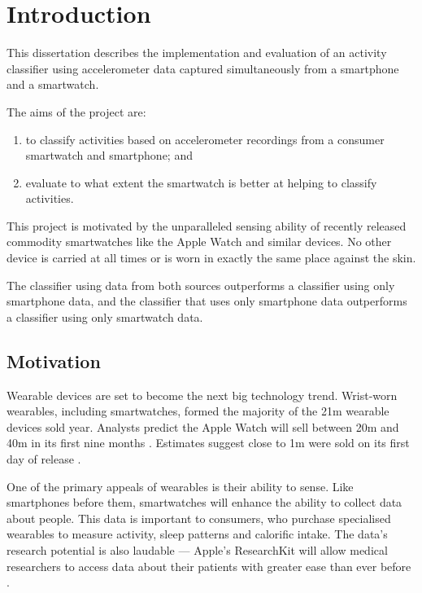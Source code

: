 \chapter{Introduction}
  This dissertation describes the implementation and evaluation of an activity classifier using 
  accelerometer data captured simultaneously from a smartphone and a smartwatch.  
  
  The aims of the project are:
  \begin{enumerate}
    \item to classify activities based on accelerometer recordings from a consumer smartwatch and smartphone; and
    \item evaluate to what extent the smartwatch is better at helping to classify activities.
  \end{enumerate}
  
  This project is motivated by the unparalleled sensing ability of recently released commodity 
  smartwatches like the Apple Watch and similar devices. No other device is carried at all times or is worn in exactly the same place against the skin.
  
  The classifier using data from both sources outperforms a classifier using only smartphone data,
  and the classifier that uses only smartphone data outperforms a classifier using only smartwatch 
  data.
  \section{Motivation}
  \label{sec:intro-motivation}
    Wearable devices are set to become the next big technology trend. Wrist-worn wearables, 
    including smartwatches, formed the majority of the 21m wearable devices sold year. Analysts
    predict the Apple Watch will sell between 20m and 40m in its first nine months 
    \cite{econapplewatch}. Estimates suggest close to 1m were sold on its first day of release
    \cite{slice2015applewatch}.
    
    One of the primary appeals of wearables is their ability to sense. Like smartphones before them,
    smartwatches will enhance the ability to collect data about people. This data is important to
    consumers, who purchase specialised wearables to measure activity, sleep patterns and 
    calorific intake. The data's research potential is also laudable --- Apple's ResearchKit will
    allow medical researchers to access data about their patients with greater ease than ever
    before \cite{appleresearchkit}.
    
